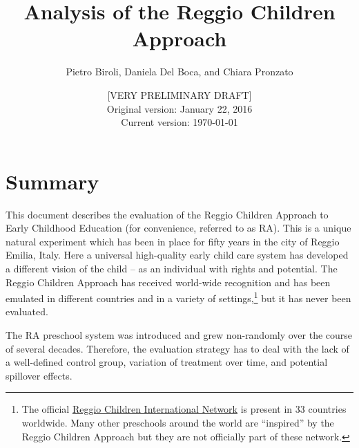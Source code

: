\documentclass[12pt]{article}
\begin{document}
\title{Analysis of the Reggio Children Approach}
\author{%
Pietro Biroli,
Daniela Del Boca,
and Chiara Pronzato %
}
\date{[VERY PRELIMINARY DRAFT] \\ Original version: January 22, 2016 \\ Current version: \today}
\maketitle 

\doublespacing

%
\section{Summary}
This document describes the evaluation of the Reggio Children Approach to Early Childhood Education (for convenience, referred to as RA). This is a unique natural experiment which has been in place for fifty years in the city of Reggio Emilia, Italy. Here a universal high-quality early child care system has developed a different vision of the child – as an individual with rights and potential. The Reggio Children Approach has received world-wide recognition and has been emulated in different countries and in a variety of settings,\footnote{The official \href{http://www.reggiochildren.it/network/?lang=en}{Reggio Children International Network} is present in 33 countries worldwide. Many other preschools around the world are ``inspired'' by the Reggio Children Approach but they are not officially part of these network.} but it has never been evaluated. 

The RA preschool system was introduced and grew non-randomly over the course of several decades. Therefore, the evaluation strategy has to deal with the lack of a well-defined control group, variation of treatment over time, and potential spillover effects. 
\end{document}
